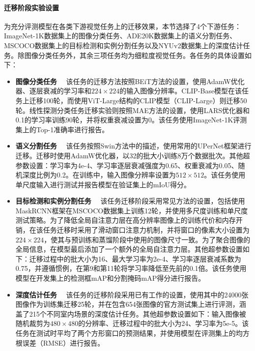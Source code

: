 \paragraph{迁移阶段实验设置} 为充分评测模型在各类下游视觉任务上的迁移效果，本节选择了4个下游任务：ImageNet-1K数据集\cite{deng2009imagenet}上的图像分类任务、ADE20K数据集\cite{zhou2019ade}上的语义分割任务、MSCOCO数据集\cite{chen2015microsoft}上的目标检测和实例分割任务以及NYUv2\cite{NYUv2}数据集上的深度估计任务。除图像分类任务外，其余三项任务均为细粒度视觉任务。各任务的具体设置如下：
\begin{itemize}
    \item \textbf{图像分类任务}~~ 该任务的迁移方法按照BEiT方法\cite{bao2021beit}的设置，使用AdamW优化器\cite{adamw}、逐层衰减的学习率和$224 \times 224$的输入图像分辨率。CLIP-Base模型在该任务上迁移100轮，而使用ViT-Large结构的CLIP模型（CLIP-Large）则迁移50轮。线性探测分类任务迁移实验则按照MAE方法的设置，使用LARS优化器\cite{lars}和0.1的学习率训练90轮，并将权重衰减设置为0。该任务使用ImageNet-1K评测集上的Top-1准确率进行报告。
    \item \textbf{语义分割任务}~~  该任务按照Swin方法\cite{Swin}中的描述，使用常用的UPerNet框架\cite{xiao2018upernet}进行迁移。迁移时使用AdamW优化器，以32的批大小训练8万个数据批次。其他超参数设置：学习率为4e-4、学习率逐层衰减强度为0.65、权重衰减为0.05、随机深度比例为0.2。在训练中，输入图像分辨率设置为$512 \times 512$。该任务使用单尺度输入进行测试并报告模型在验证集上的mIoU得分。
    \item \textbf{目标检测和实例分割任务}~~  该任务迁移阶段采用常见方法\cite{cae}的设置，包括使用MaskRCNN框架\cite{Mask-rcnn}在MSCOCO数据集上训练12轮，并使用多尺度训练和单尺度测试策略。为了降低全局自注意力层在高分辨率图像上的训练代价和内存开销，在该任务迁移时采用了滑动窗口注意力机制\cite{Swin}，并将窗口的像素大小设置为$224 \times 224$，使其与预训练和蒸馏阶段中使用的图像尺寸一致。为了聚合图像的全局信息，在模型最后添加了一个额外的全局自注意力层。其他超参数设置如下：迁移过程中的批大小为16、最大学习率为2e-4、学习率逐层衰减系数为0.75，并遵循惯例，在第9和第11轮将学习率降低至先前的0.1倍。该任务使用模型在开发集上的检测框mAP和分割掩码mAP得分进行报告。
    \item \textbf{深度估计任务}~~  该任务的迁移阶段采用已有工作\cite{glpdepth, xie2023revealing}的设置，使用其中的24000张图像作为训练集迁移25轮，并在包含654张图像的官方测试集上进行评测，涵盖了215个不同室内场景的深度估计任务。其他超参数设置如下：输入图像被随机裁剪为$480 \times 480$的分辨率、迁移过程中的批大小为24、学习率为5e-5。该任务在测试时平均了两个方形窗口的预测结果，并使用模型在评测集上的均方根误差（RMSE）进行报告。
\end{itemize}

